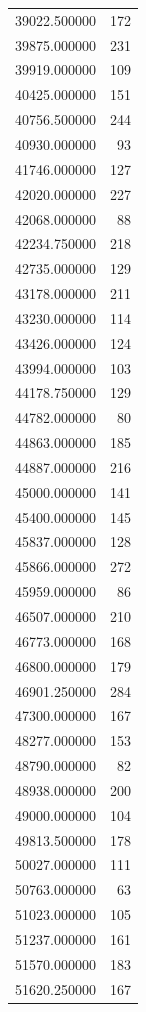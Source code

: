 \begin{tabular}{lr}
39022.500000  &   172 \\
39875.000000  &   231 \\
39919.000000  &   109 \\
40425.000000  &   151 \\
40756.500000  &   244 \\
40930.000000  &    93 \\
41746.000000  &   127 \\
42020.000000  &   227 \\
42068.000000  &    88 \\
42234.750000  &   218 \\
42735.000000  &   129 \\
43178.000000  &   211 \\
43230.000000  &   114 \\
43426.000000  &   124 \\
43994.000000  &   103 \\
44178.750000  &   129 \\
44782.000000  &    80 \\
44863.000000  &   185 \\
44887.000000  &   216 \\
45000.000000  &   141 \\
45400.000000  &   145 \\
45837.000000  &   128 \\
45866.000000  &   272 \\
45959.000000  &    86 \\
46507.000000  &   210 \\
46773.000000  &   168 \\
46800.000000  &   179 \\
46901.250000  &   284 \\
47300.000000  &   167 \\
48277.000000  &   153 \\
48790.000000  &    82 \\
48938.000000  &   200 \\
49000.000000  &   104 \\
49813.500000  &   178 \\
50027.000000  &   111 \\
50763.000000  &    63 \\
51023.000000  &   105 \\
51237.000000  &   161 \\
51570.000000  &   183 \\
51620.250000  &   167 \\

\end{tabular}

